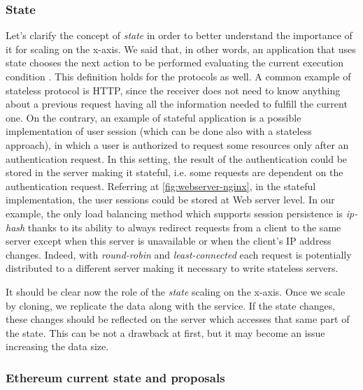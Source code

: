 \subsubsection{State}
Let's clarify the concept of \emph{state} in order to better understand the
importance of it for scaling on the x-axis. We said that, in other words, an
application that uses state chooses the next action to be performed evaluating
the current execution condition \cite{bib:art-of-scalability}. This definition
holds for the protocols as well. A common example of stateless protocol is HTTP,
since the receiver does not need to know anything about a previous request
having all the information needed to fulfill the current one. On the contrary,
an example of stateful application is a possible implementation of user session
(which can be done also with a stateless approach), in which a user is
authorized to request some resources only after an authentication request. In
this setting, the result of the authentication could be stored in the server
making it stateful, i.e. some requests are dependent on the authentication
request. Referring at \autoref{fig:webserver-nginx}, in the stateful
implementation, the user sessions could be stored at Web server level. In our
example, the only load balancing method which supports session persistence is
\emph{ip-hash} thanks to its ability to always redirect requests from a client
to the same server except when this server is unavailable or when the client's
IP address changes. Indeed, with \emph{round-robin} and \emph{least-connected}
each request is potentially distributed to a different server making it
necessary to write stateless servers.

It should be clear now the role of the \emph{state} scaling on the x-axis. Once
we scale by cloning, we replicate the data along with the service. If the state
changes, these changes should be reflected on the server which accesses that
same part of the state. This can be not a drawback at first, but it may become
an issue increasing the data size.

\subsubsection{Ethereum current state and proposals}
\label{sec:x-axis-ethereum}

